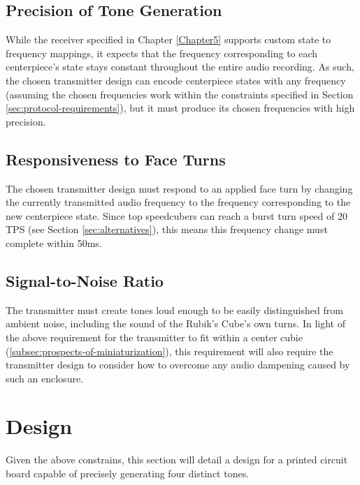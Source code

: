 \subsection{Precision of Tone Generation}
\label{subsec:precision-of-tone-generation}

While the receiver specified in Chapter \ref{Chapter5} supports custom
state to frequency mappings, it expects that the frequency
corresponding to each centerpiece's state stays constant throughout the
entire audio recording. As such, the chosen transmitter design can
encode centerpiece states with any frequency (assuming the chosen
frequencies work within the constraints specified in Section
\ref{sec:protocol-requirements}), but it must produce its chosen
frequencies with high precision.

\subsection{Responsiveness to Face Turns}
\label{subsec:responsiveness-to-face-turns}

The chosen transmitter design must respond to an applied face turn by
changing the currently transmitted audio frequency to the frequency
corresponding to the new centerpiece state. Since top speedcubers can
reach a burst turn speed of 20 TPS (see Section
\ref{sec:alternatives}), this means this frequency change must complete
within 50ms.

\subsection{Signal-to-Noise Ratio}
\label{subsec:transmitter-signal-to-noise-ratio}

The transmitter must create tones loud enough to be easily
distinguished from ambient noise, including the sound of the Rubik's
Cube's own turns. In light of the above requirement for the transmitter
to fit within a center cubie
(\ref{subsec:prospects-of-miniaturization}), this requirement will also
require the transmitter design to consider how to overcome any audio
dampening caused by such an enclosure.


\newpage
\section{Design}
\label{sec:transmitter-design}

Given the above constrains, this section will detail a design for a
printed circuit board capable of precisely generating four distinct
tones.

